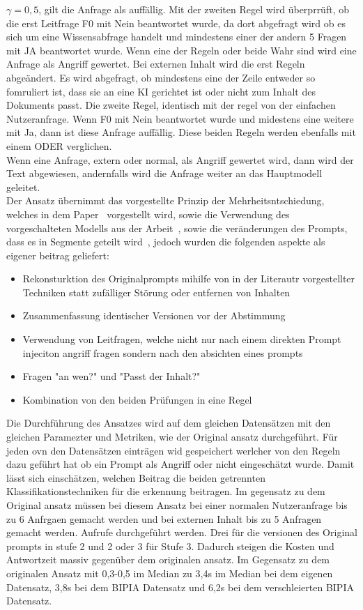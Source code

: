 $\gamma = 0{,}5$, gilt die Anfrage als auffällig. Mit der zweiten Regel wird überprrüft, ob die erst Leitfrage
F0 mit Nein beantwortet wurde, da dort abgefragt wird ob es sich um eine Wissensabfrage handelt und mindestens einer der andern 5 Fragen mit JA beantwortet wurde. Wenn
eine der Regeln oder beide Wahr sind wird eine Anfrage als Angriff gewertet.
Bei externen Inhalt wird die erst Regeln abgeändert. Es wird abgefragt, ob mindestens eine der Zeile entweder so fomruliert ist, dass sie an eine KI gerichtet ist oder
nicht zum Inhalt des Dokuments passt. Die zweite Regel, identisch mit der regel von der einfachen Nutzeranfrage. Wenn F0 mit Nein beantwortet wurde und midestens 
eine weitere mit Ja, dann ist diese Anfrage auffällig. Diese beiden Regeln werden ebenfalls mit einem ODER verglichen. \\
Wenn eine Anfrage, extern oder normal, als Angriff gewertet wird, dann wird der Text abgewiesen, andernfalls wird die Anfrage weiter an das Hauptmodell geleitet. \\
Der Ansatz übernimmt das vorgestellte Prinzip der Mehrheitsntschiedung, welches in dem Paper~\cite{sm40} vorgestellt wird, sowie die Verwendung des vorgeschalteten 
Modells aus der Arbeit~\cite[30426]{sm37}, sowie die veränderungen des Prompts, dass es in Segmente geteilt wird~\cite[18193]{sm41}, jedoch wurden die folgenden 
aspekte als eigener beitrag geliefert: \\
\begin{itemize}
    \item Rekonsturktion des Originalprompts mihilfe von in der Literautr vorgestellter Techniken statt zufälliger Störung oder entfernen von Inhalten
    \item Zusammenfassung identischer Versionen vor der Abstimmung
    \item Verwendung von Leitfragen, welche nicht nur nach einem direkten Prompt injeciton angriff fragen sondern nach den absichten eines prompts
    \item Fragen "an wen?" und "Passt der Inhalt?" 
    \item Kombination von den beiden Prüfungen in eine Regel
\end{itemize}
Die Durchführung des Ansatzes wird auf dem gleichen Datensätzen mit den gleichen Paramezter und Metriken, wie der Original ansatz durchgeführt. Für jeden ovn den 
Datensätzen einträgen wid gespeichert werlcher von den Regeln dazu geführt hat ob ein Prompt als Angriff oder nicht eingeschätzt wurde. Damit lässt sich 
einschätzen, welchen Beitrag die beiden getrennten Klassifikationstechniken für die erkennung beitragen.
Im gegensatz zu dem Original ansatz müssen bei diesem Ansatz bei einer normalen Nutzeranfrage bis zu 6 Anfrgaen gemacht werden und bei externen Inhalt bis zu 5
Anfragen gemacht werden. Aufrufe durchgeführt werden. Drei für die versionen des Original prompts in stufe 2 und 2 oder 3 für Stufe 3.
Dadurch steigen die Kosten und Antwortzeit massiv gegenüber dem originalen ansatz. Im Gegensatz zu dem originalen Ansatz mit 0,3-0,5 im Median zu 3,4s im Median bei 
dem eigenen Datensatz, 3,8s bei dem BIPIA Datensatz und 6,2s bei dem verschleierten BIPIA Datensatz. 

